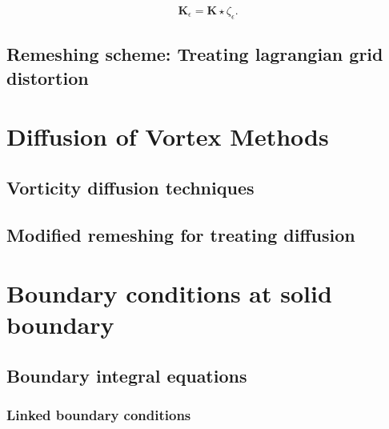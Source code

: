 \begin{equation}
\mathbf{K}_{\epsilon} = \mathbf{K} \star \zeta_{\epsilon}.
\end{equation}

\subsection{Remeshing scheme: Treating lagrangian grid distortion}

\section{Diffusion of Vortex Methods}

\subsection{Vorticity diffusion techniques}

\subsection{Modified remeshing for treating diffusion}

\section{Boundary conditions at solid boundary}

\subsection{Boundary integral equations}

\subsubsection{Linked boundary conditions}

